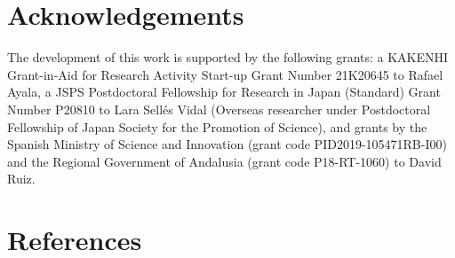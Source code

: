\hypertarget{acknowledgements}{%
\section{Acknowledgements}\label{acknowledgements}}

The development of this work is supported by the following grants: a KAKENHI Grant-in-Aid for Research Activity Start-up Grant Number 21K20645 to Rafael Ayala, a JSPS Postdoctoral Fellowship for Research in Japan (Standard) Grant Number P20810 to Lara Sellés Vidal (Overseas researcher under Postdoctoral Fellowship of Japan Society for the Promotion of Science), and grants by the Spanish Ministry of Science and Innovation (grant code PID2019-105471RB-I00) and the Regional Government of Andalusia (grant code P18-RT-1060) to David Ruiz.

\hypertarget{references}{%
\section*{References}\label{references}}

